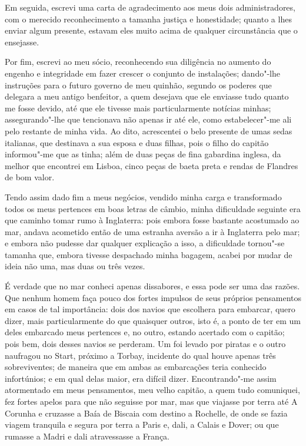 Em seguida, escrevi uma carta de agradecimento aos meus dois
administradores, com o merecido reconhecimento a tamanha justiça e
honestidade; quanto a lhes enviar algum presente, estavam eles muito
acima de qualquer circunstância que o ensejasse.

Por fim, escrevi ao meu sócio, reconhecendo sua diligência no aumento do
engenho e integridade em fazer crescer o conjunto de instalações;
dando"-lhe instruções para o futuro governo de meu quinhão, segundo os
poderes que delegara a meu antigo benfeitor, a quem desejava que ele
enviasse tudo quanto me fosse devido, até que ele tivesse mais
particularmente notícias minhas; assegurando"-lhe que tencionava não
apenas ir até ele, como estabelecer"-me ali pelo restante de minha vida.
Ao dito, acrescentei o belo presente de umas sedas italianas, que
destinava a sua esposa e duas filhas, pois o filho do capitão
informou"-me que as tinha; além de duas peças de fina gabardina inglesa,
da melhor que encontrei em Lisboa, cinco peças de baeta preta e rendas
de Flandres de bom valor.

Tendo assim dado fim a meus negócios, vendido minha carga e transformado
todos os meus pertences em boas letras de câmbio, minha dificuldade
seguinte era que caminho tomar rumo à Inglaterra: pois embora fosse
bastante acostumado ao mar, andava acometido então de uma estranha
aversão a ir à Inglaterra pelo mar; e embora não pudesse dar qualquer
explicação a isso, a dificuldade tornou"-se tamanha que, embora tivesse
despachado minha bagagem, acabei por mudar de ideia não uma, mas duas ou
três vezes.

É verdade que no mar conheci apenas dissabores, e essa pode ser uma das
razões. Que nenhum homem faça pouco dos fortes impulsos de seus próprios
pensamentos em casos de tal importância: dois dos navios que escolhera
para embarcar, quero dizer, mais particularmente do que quaisquer
outros, isto é, a ponto de ter em um deles embarcado meus pertences e,
no outro, estando acertado com o capitão; pois bem, dois desses navios
se perderam. Um foi levado por piratas e o outro naufragou no Start,
próximo a Torbay, incidente do qual houve apenas três sobreviventes; de
maneira que em ambas as embarcações teria conhecido infortúnios; e em
qual delas maior, era difícil dizer. Encontrando"-me assim atormentado em
meus pensamentos, meu velho capitão, a quem tudo comuniquei, fez fortes
apelos para que não seguisse por mar, mas que viajasse por terra até A
Corunha e cruzasse a Baía de Biscaia com destino a Rochelle, de onde se
fazia viagem tranquila e segura por terra a Paris e, dali, a Calais e
Dover; ou que rumasse a Madri e dali atravessasse a França.

